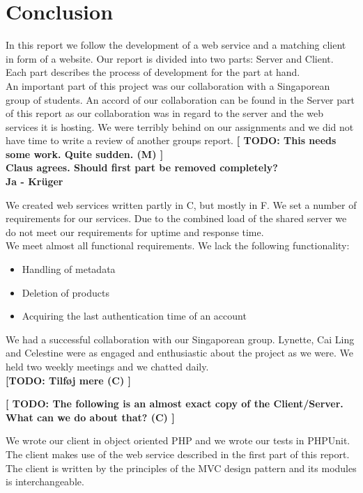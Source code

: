 \section{Conclusion}
In this report we follow the development of a web service and a matching client in form of a website. Our report is divided into two parts: Server and Client. Each part describes the process of development for the part at hand.
\\An important part of this project was our collaboration with a Singaporean group of students. An accord of our collaboration can be found in the Server part of this report as our collaboration was in regard to the server and the web services it is hosting.
We were terribly behind on our assignments and we did not have time to write a review of another groups report. \textbf{[ TODO: This needs some work. Quite sudden. (M) ]}
\\\textbf{Claus agrees. Should first part be removed completely?\\Ja - Krüger}

We created web services written partly in C\Sh, but mostly in F\Sh. We set a number of requirements for our services. Due to the combined load of the shared server we do not meet our requirements for uptime and response time.
\\We meet almost all functional requirements. We lack the following functionality:
\begin{itemize}
\item Handling of metadata
\item Deletion of products
\item Acquiring the last authentication time of an account
\end{itemize}

We had a successful collaboration with our Singaporean group. Lynette, Cai Ling and Celestine were as engaged and enthusiastic about the project as we were. We held two weekly meetings and we chatted daily.
\\\textbf{ [TODO: Tilføj mere (C) ]}

\textbf{[ TODO: The following is an almost exact copy of the Client/Server. What can we do about that? (C) ]}

We wrote our client in object oriented PHP and we wrote our tests in PHPUnit. The client makes use of the web service described in the first part of this report. The client is written by the principles of the MVC design pattern and its modules is interchangeable.

